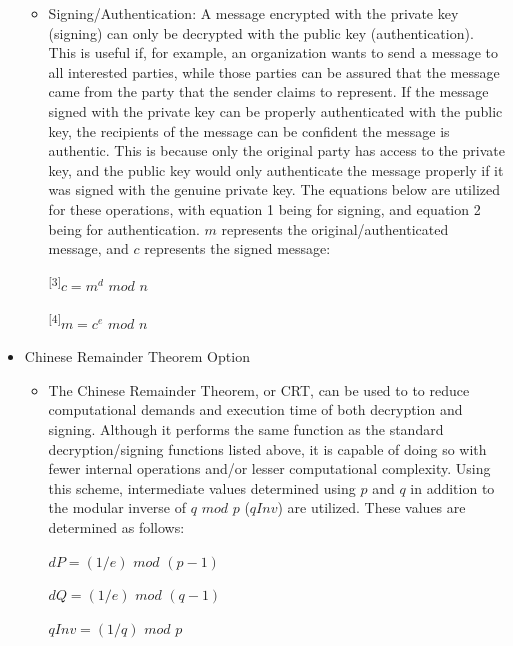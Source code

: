 \documentclass[11pt]{article}
\begin{document}
\begin{itemize}
{\begin{itemize}
{\begin{itemize}
{\textsuperscript{[1]}$c = m^e$ $mod$ $n$

\textsuperscript{[2]}$m = c^d$ $mod$ $n$
\newline
		}
		\item
		{
		Signing/Authentication: A message encrypted with the private key (signing) can only be decrypted with the public key (authentication). This is useful if, for example, an organization wants to send a message to all interested parties, while those parties can be assured that the message came from the party that the sender claims to represent. If the  message signed with the private key can be properly authenticated with the public key, the recipients of the message can be confident the message is authentic. This is because only the original party has access to the private key, and the public key would only authenticate the message properly if it was signed with the genuine private key. The equations below are utilized for these operations, with equation 1 being for signing, and equation 2 being for authentication. $m$ represents the original/authenticated message, and $c$ represents the signed message:\newline

\textsuperscript{[3]}$c = m^d$ $mod$ $n$

\textsuperscript{[4]}$m = c^e$ $mod$ $n$
\newline
		}
		\end{itemize}
	}
	\end{itemize}
}
\item
{Chinese Remainder Theorem Option
	\begin{itemize}
	\item
	{The Chinese Remainder Theorem, or CRT, can be used to to reduce computational demands and execution time of both decryption and signing. Although it performs the same function as the standard decryption/signing functions listed above, it is capable of doing so with fewer internal operations and/or lesser computational complexity. Using this scheme, intermediate values determined using $p$ and $q$ in addition to the modular inverse of $q$ $mod$ $p$ ($qInv$) are utilized. These values are determined as follows:

\begin{center}


$dP = (1/e)$ $mod$ $(p - 1)$

$dQ = (1/e)$ $mod$ $(q - 1)$

$qInv = (1/q)$ $mod$ $p$
\end{center}

}
\end{itemize}}
\end{itemize}
\end{document}
